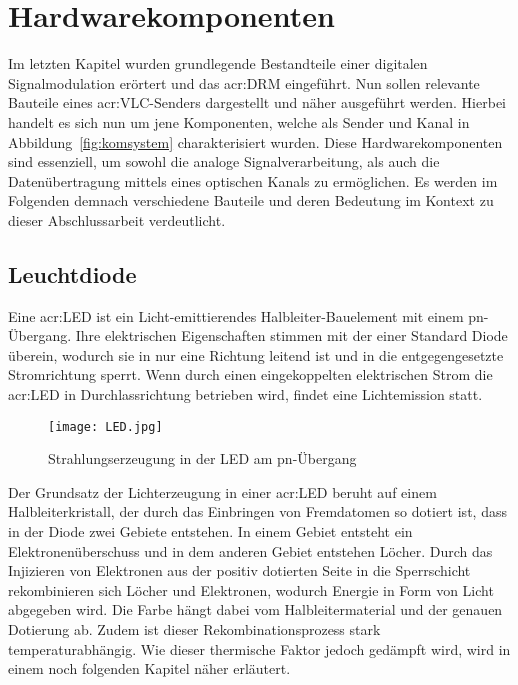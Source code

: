 \section{Hardwarekomponenten}
\label{subsec:elbau}
Im letzten Kapitel wurden grundlegende Bestandteile einer digitalen Signalmodulation erörtert und das \gls{acr:DRM} eingeführt. Nun sollen relevante Bauteile eines \gls{acr:VLC}-Senders dargestellt und näher ausgeführt werden. Hierbei handelt es sich nun um jene Komponenten, welche als Sender und Kanal in Abbildung~\ref{fig:komsystem} charakterisiert wurden. Diese Hardwarekomponenten sind essenziell, um sowohl die analoge Signalverarbeitung, als auch die Datenübertragung mittels eines optischen Kanals zu ermöglichen. Es werden im Folgenden demnach verschiedene Bauteile und deren Bedeutung im Kontext zu dieser Abschlussarbeit verdeutlicht.

\subsection{Leuchtdiode}
\label{sub:led}

Eine \gls{acr:LED} ist ein Licht-emittierendes Halbleiter-Bauelement mit einem pn-Übergang. Ihre elektrischen Eigenschaften stimmen mit der einer Standard Diode überein, wodurch sie in nur eine Richtung leitend ist und in die entgegengesetzte Stromrichtung sperrt. Wenn durch einen eingekoppelten elektrischen Strom die \gls{acr:LED} in Durchlassrichtung betrieben wird, findet eine Lichtemission statt.\cite{slabke} 

\begin{figure}[H]
	\centering
	\texttt{[image: LED.jpg]}
	\caption[Strahlungserzeugung in der LED am pn-Übergang]{Strahlungserzeugung in der LED am pn-Übergang} \cite{slabke}
	\label{fig:LED}
\end{figure}

Der Grundsatz der Lichterzeugung in einer \gls{acr:LED} beruht auf einem Halbleiterkristall, der durch das Einbringen von Fremdatomen so dotiert ist, dass in der Diode zwei Gebiete entstehen. In einem Gebiet entsteht ein Elektronenüberschuss und in dem anderen Gebiet entstehen Löcher. Durch das Injizieren von Elektronen aus der positiv dotierten Seite in die Sperrschicht rekombinieren sich Löcher und Elektronen, wodurch Energie in Form von Licht abgegeben wird.\cite{slabke} Die Farbe hängt dabei vom Halbleitermaterial und der genauen Dotierung ab. Zudem ist dieser Rekombinationsprozess stark temperaturabhängig.\cite{heringElektrotechnikUndElektronik2018}  Wie dieser thermische Faktor jedoch gedämpft wird, wird in einem noch folgenden Kapitel näher erläutert.


